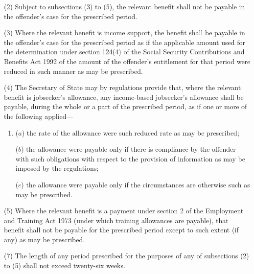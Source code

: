 \documentclass[12pt,a4paper]{article}
\begin{document}
(2) Subject to subsections (3)  to (5), the relevant benefit shall not be payable in the offender’s case for the prescribed period.

(3) Where the relevant benefit is income support, the benefit shall be payable in the offender’s case for the prescribed period as if the applicable amount used for the determination under section 124(4)  of the Social Security Contributions and Benefits Act 1992 of the amount of the offender’s entitlement for that period were reduced in such manner as may be prescribed.

(4) The Secretary of State may by regulations provide that, where the relevant benefit is jobseeker’s allowance, any income-based jobseeker’s allowance shall be payable, during the whole or a part of the prescribed period, as if one or more of the following applied—
\begin{enumerate}\item[]
($a$) the rate of the allowance were such reduced rate as may be prescribed;

($b$) the allowance were payable only if there is compliance by the offender with such obligations with respect to the provision of information as may be imposed by the regulations;

($c$) the allowance were payable only if the circumstances are otherwise such as may be prescribed.
\end{enumerate}

(5) Where the relevant benefit is a payment under section 2 of the Employment and Training Act 1973 (under which training allowances are payable), that benefit shall not be payable for the prescribed period except to such extent (if any) as may be prescribed.


(7) The length of any period prescribed for the purposes of any of subsections (2)  to (5)  shall not exceed twenty-six weeks.
\end{document}
